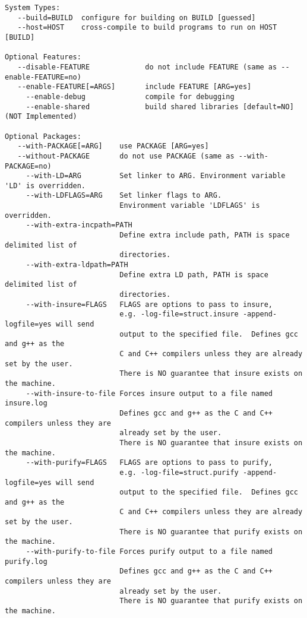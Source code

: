 \begin{verbatim}
System Types:
   --build=BUILD  configure for building on BUILD [guessed]
   --host=HOST    cross-compile to build programs to run on HOST [BUILD]

Optional Features:
   --disable-FEATURE             do not include FEATURE (same as --enable-FEATURE=no)
   --enable-FEATURE[=ARGS]       include FEATURE [ARG=yes]
     --enable-debug              compile for debugging
     --enable-shared             build shared libraries [default=NO]  (NOT Implemented)

Optional Packages:
   --with-PACKAGE[=ARG]    use PACKAGE [ARG=yes]
   --without-PACKAGE       do not use PACKAGE (same as --with-PACKAGE=no)
     --with-LD=ARG         Set linker to ARG. Environment variable 'LD' is overridden.
     --with-LDFLAGS=ARG    Set linker flags to ARG. 
                           Environment variable 'LDFLAGS' is overridden.
     --with-extra-incpath=PATH
                           Define extra include path, PATH is space delimited list of
                           directories.
     --with-extra-ldpath=PATH
                           Define extra LD path, PATH is space delimited list of
                           directories.
     --with-insure=FLAGS   FLAGS are options to pass to insure,
                           e.g. -log-file=struct.insure -append-logfile=yes will send
                           output to the specified file.  Defines gcc and g++ as the 
                           C and C++ compilers unless they are already set by the user.
                           There is NO guarantee that insure exists on the machine.
     --with-insure-to-file Forces insure output to a file named insure.log
                           Defines gcc and g++ as the C and C++ compilers unless they are
                           already set by the user.
                           There is NO guarantee that insure exists on the machine.
     --with-purify=FLAGS   FLAGS are options to pass to purify,
                           e.g. -log-file=struct.purify -append-logfile=yes will send
                           output to the specified file.  Defines gcc and g++ as the 
                           C and C++ compilers unless they are already set by the user.
                           There is NO guarantee that purify exists on the machine.
     --with-purify-to-file Forces purify output to a file named purify.log
                           Defines gcc and g++ as the C and C++ compilers unless they are
                           already set by the user.
                           There is NO guarantee that purify exists on the machine.

\end{verbatim}
